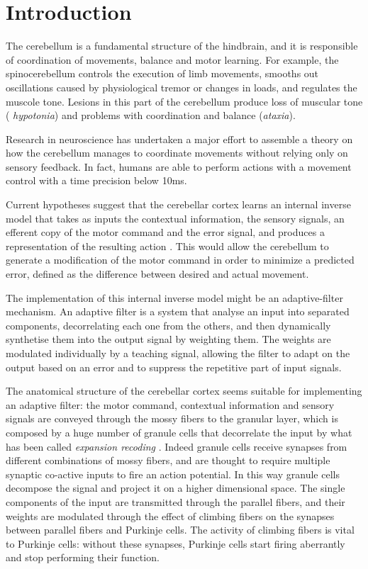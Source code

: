 \section{Introduction}

The cerebellum is a fundamental structure of the hindbrain, and it is responsible of coordination of movements, balance and motor learning. For example, the spinocerebellum controls the execution of limb movements, smooths out oscillations caused by physiological tremor or changes in loads, and regulates the muscole tone. Lesions in this part of the cerebellum produce loss of muscular tone (\emph{ hypotonia}) and problems with coordination and balance (\emph{ataxia}).

Research in neuroscience has undertaken a major effort to assemble a theory on how the cerebellum manages to coordinate movements without relying only on sensory feedback. In fact, humans are able to perform actions with a movement control with a time precision below 10ms.

Current hypotheses suggest that the cerebellar cortex learns an internal inverse model that takes as inputs the contextual information, the sensory signals, an efferent copy of the motor command and the error signal, and produces a representation of the resulting action \cite{wolpert1998internal}.
This would allow the cerebellum to generate a modification of the motor command in order to minimize a predicted error, defined as the difference between desired and actual movement.

The implementation of this internal inverse model might be an adaptive-filter mechanism. An adaptive filter is a system that analyse an input into separated components, decorrelating each one from the others, and then dynamically synthetise them into the output signal by weighting them. The weights are modulated individually by a teaching signal, allowing the filter to adapt on the output based on an error and to suppress the repetitive part of input signals.

The anatomical structure of the cerebellar cortex seems suitable for implementing an adaptive filter: the motor command, contextual information and sensory signals are conveyed through the mossy fibers to the granular layer, which is composed by a huge number of granule cells that decorrelate the input by what has been called \emph{expansion recoding} \cite{huang2013convergence}. Indeed granule cells receive synapses from different combinations of mossy fibers, and are thought to require multiple synaptic co-active inputs to fire an action potential. In this way granule cells decompose the signal and project it on a higher dimensional space. The single components of the input are transmitted through the parallel fibers, and their weights are modulated through the effect of climbing fibers on the synapses between parallel fibers and Purkinje cells. The activity of climbing fibers is vital to Purkinje cells: without these synapses, Purkinje cells start firing aberrantly and stop performing their function. 

